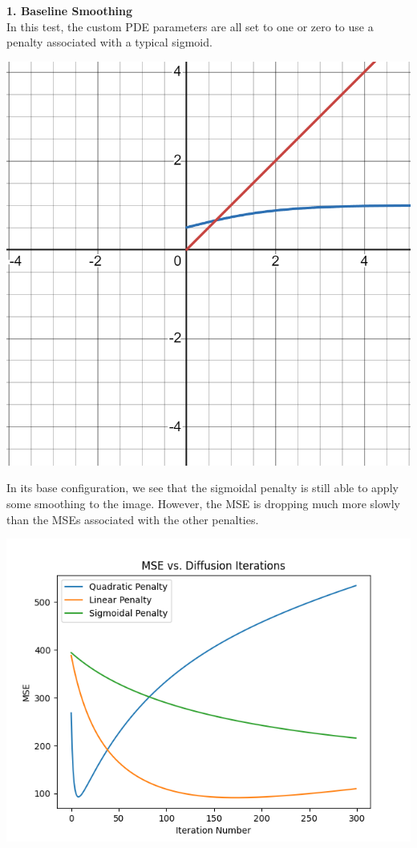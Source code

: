 \documentclass{article}
\begin{document}
  \noindent
  \textbf{1. Baseline Smoothing}\\
  In this test, the custom PDE parameters are all set to one or zero to use 
  a penalty associated with a typical sigmoid.\\
  \begin{center}
    \includegraphics[scale=0.2]{../report_images/baseline_smoothing.png}\\
  \end{center}
  \vspace{12pt}

  \noindent 
  In its base configuration, we see that the sigmoidal penalty is still able to
  apply some smoothing to the image. However, the MSE  is dropping much more
  slowly than the MSEs associated with the other penalties.

  \begin{center}
    \includegraphics[scale=.5]{../generated_images/MSE_test1.png}\\
  \end{center}
\end{document}
